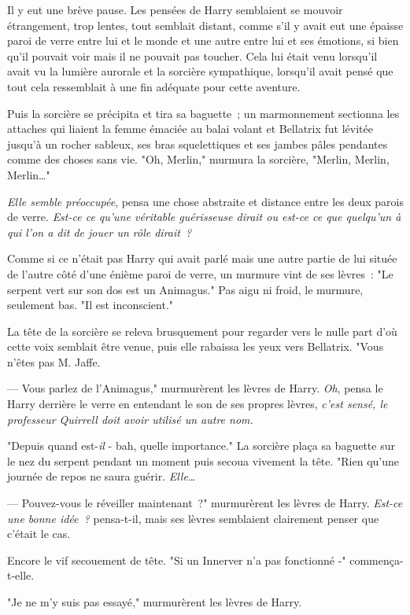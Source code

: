 Il y eut une brève pause. Les pensées de Harry semblaient se mouvoir étrangement, trop lentes, tout semblait distant, comme s'il y avait eut une épaisse paroi de verre entre lui et le monde et une autre entre lui et ses émotions, si bien qu'il pouvait voir mais il ne pouvait pas toucher. Cela lui était venu lorsqu'il avait vu la lumière aurorale et la sorcière sympathique, lorsqu'il avait pensé que tout cela ressemblait à une fin adéquate pour cette aventure.

Puis la sorcière se précipita et tira sa baguette~; un marmonnement sectionna les attaches qui liaient la femme émaciée au balai volant et Bellatrix fut lévitée jusqu'à un rocher sableux, ses bras squelettiques et ses jambes pâles pendantes comme des choses sans vie. "Oh, Merlin," murmura la sorcière, "Merlin, Merlin, Merlin…"

\emph{Elle semble préoccupée}, pensa une chose abstraite et distance entre les deux parois de verre. \emph{Est-ce ce qu'une véritable guérisseuse dirait ou est-ce ce que quelqu'un à qui l'on a dit de jouer un rôle dirait~?}

Comme si ce n'était pas Harry qui avait parlé mais une autre partie de lui située de l'autre côté d'une énième paroi de verre, un murmure vint de ses lèvres~: "Le serpent vert sur son dos est un Animagus." Pas aigu ni froid, le murmure, seulement bas. "Il est inconscient."

La tête de la sorcière se releva brusquement pour regarder vers le nulle part d'où cette voix semblait être venue, puis elle rabaissa les yeux vers Bellatrix. "Vous n'êtes pas M. Jaffe.

--- Vous parlez de l'Animagus," murmurèrent les lèvres de Harry. \emph{Oh}, pensa le Harry derrière le verre en entendant le son de ses propres lèvres, \emph{c'est sensé, le professeur Quirrell doit avoir utilisé un autre nom.}

"Depuis quand est-\emph{il} - bah, quelle importance." La sorcière plaça sa baguette sur le nez du serpent pendant un moment puis secoua vivement la tête. "Rien qu'une journée de repos ne saura guérir. \emph{Elle…}

--- Pouvez-vous le réveiller maintenant~?" murmurèrent les lèvres de Harry. \emph{Est-ce une bonne idée~?} pensa-t-il, mais ses lèvres semblaient clairement penser que c'était le cas.

Encore le vif secouement de tête. "Si un Innerver n'a pas fonctionné -" commença-t-elle.

"Je ne m'y suis pas essayé," murmurèrent les lèvres de Harry.

